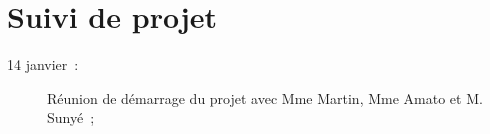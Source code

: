 \appendix

\chapter{Suivi de projet}

\begin{description}
\item[14 janvier~:] Réunion de démarrage du projet avec Mme Martin, Mme Amato et M. Sunyé~;
\end{description}



\printindex
